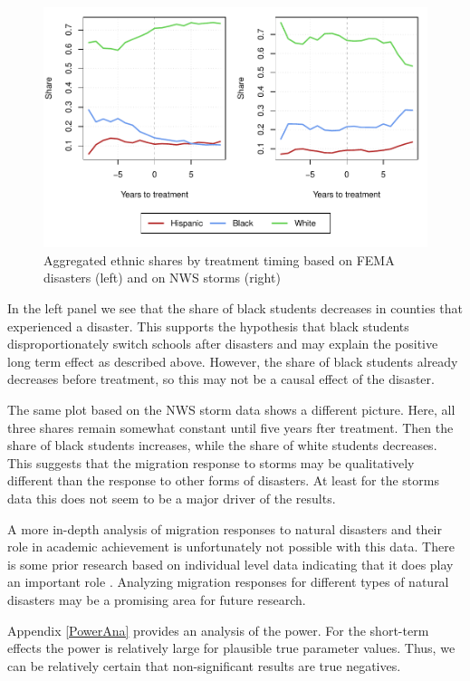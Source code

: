 \begin{figure}[!h]
	\centering
	\includegraphics[scale=1]{"../Code & Data/EthnicComposition.pdf"}
	\caption{Aggregated ethnic shares by treatment timing based on FEMA disasters (left) and on NWS storms (right)}
	\label{EthnicComposition}
\end{figure}

In the left panel we see that the share of black students decreases in counties that experienced a disaster. This supports the hypothesis that black students disproportionately switch schools after disasters and may explain the positive long term effect as described above. However, the share of black students already decreases before treatment, so this may not be a causal effect of the disaster.

The same plot based on the NWS storm data shows a different picture. Here, all three shares remain somewhat constant until five years fter treatment. Then the share of black students increases, while the share of white students decreases. This suggests that the migration response to storms may be qualitatively different than the response to other forms of disasters. At least for the storms data this does not seem to be a major driver of the results.

A more in-depth analysis of migration responses to natural disasters and their role in academic achievement is unfortunately not possible with this data. There is some prior research based on individual level data indicating that it does play an important role \citep[for example][]{Sacerdote_2012}. Analyzing migration responses for different types of natural disasters may be a promising area for future research.

Appendix \ref{PowerAna} provides an analysis of the power. For the short-term effects the power is relatively large for plausible true parameter values. Thus, we can be relatively certain that non-significant results are true negatives.

